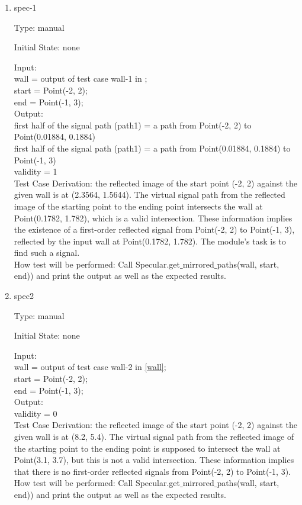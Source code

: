 \documentclass[12pt, titlepage]{article}
\begin{document}
\begin{enumerate}

\item{spec-1\\}

Type: manual
					
Initial State: none
					
Input: \\
wall = output of test case wall-1 in ;\\
start = Point(-2, 2);\\
end = Point(-1, 3);\\
					
Output: \\
first half of the signal path (path1) = a path from Point(-2, 2) to Point(0.01884, 0.1884)\\
first half of the signal path (path1) = a path from Point(0.01884, 0.1884) to Point(-1, 3)\\
validity = 1\\

Test Case Derivation: the reflected image of the start point (-2, 2) against the given wall is at (2.3564, 1.5644). The virtual signal path from the reflected image of the starting point to the ending point intersects the wall at Point(0.1782, 1.782), which is a valid intersection. These information implies the existence of a first-order reflected signal from Point(-2, 2) to Point(-1, 3), reflected by the input wall at Point(0.1782, 1.782). The module's task is to find such a signal.\\

How test will be performed: Call Specular.get$\_$mirrored$\_$paths(wall, start, end)) and print the output as well as the expected results.

\item{spec2\\}

Type: manual
					
Initial State: none
					
Input: \\
wall = output of test case wall-2 in \autoref{wall};\\
start = Point(-2, 2);\\
end = Point(-1, 3);\\
					
Output: \\
validity = 0\\

Test Case Derivation: the reflected image of the start point (-2, 2) against the given wall is at (8.2, 5.4). The virtual signal path from the reflected image of the starting point to the ending point is supposed to intersect the wall at Point(3.1, 3.7), but this is not a valid intersection. These information implies that there is no first-order reflected signals from Point(-2, 2) to Point(-1, 3).\\

How test will be performed: Call Specular.get$\_$mirrored$\_$paths(wall, start, end)) and print the output as well as the expected results.

\end{enumerate}
\end{document}
